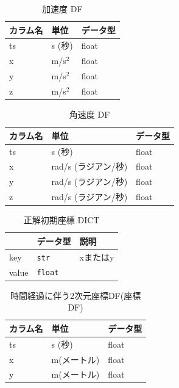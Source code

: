 \begin{table}[ht]
	\centering
	\begin{tabular}{lll}
		\toprule
		カラム名 & 単位        & データ型  \\
		\midrule
		ts   & s (秒)     & float \\
		x    & m/s\(^2\) & float \\
		y    & m/s\(^2\) & float \\
		z    & m/s\(^2\) & float \\
		\bottomrule
	\end{tabular}
	\caption{加速度 DF}
\end{table}

\begin{table}[ht]
	\centering
	\begin{tabular}{lll}
		\toprule
		カラム名 & 単位             & データ型  \\
		\midrule
		ts   & s (秒)          & float \\
		x    & rad/s (ラジアン/秒) & float \\
		y    & rad/s (ラジアン/秒) & float \\
		z    & rad/s (ラジアン/秒) & float \\
		\bottomrule
	\end{tabular}
	\caption{角速度 DF}
\end{table}


\begin{table}[ht]
	\centering
	\label{tab:first-coord-dict}
	\begin{tabular}{lll}
		\hline
		      & {データ型}         & {説明}          \\ \hline
		key   & \texttt{str}   & xまたはy         \\ \hline
		value & \texttt{float} & \makecell{座標} \\ \hline
	\end{tabular}
	\caption{正解初期座標 DICT}
\end{table}


\begin{table}[ht]
	\centering
	\begin{tabular}{lll}
		\toprule
		カラム名 & 単位      & データ型  \\
		\midrule
		ts   & s (秒)   & float \\
		x    & m(メートル) & float \\
		y    & m(メートル) & float \\
		\bottomrule
	\end{tabular}
  \caption{時間経過に伴う2次元座標DF(座標DF)}
\end{table}


